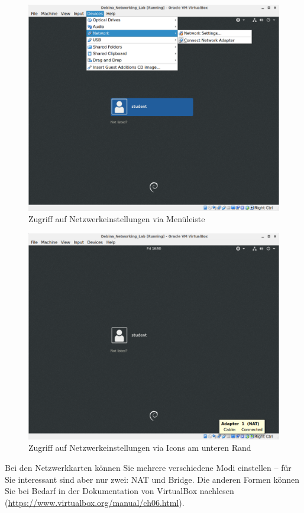 \documentclass[paper=a4,fontsize=11pt]{scrartcl}%
\numberwithin{equation}{section}
\begin{document}
\begin{figure}[H]
\centering
\includegraphics[scale=0.4]{vbox3}
\caption{Zugriff auf Netzwerkeinstellungen via Menüleiste}
\label{vbox3}
\end{figure}
\begin{figure}[H]
\centering
\includegraphics[scale=0.4]{vbox4}
\caption{Zugriff auf Netzwerkeinstellungen via Icons am unteren Rand}
\label{vbox4}
\end{figure}
Bei den Netzwerkkarten können Sie mehrere verschiedene Modi einstellen -- für Sie interessant
sind aber nur zwei: NAT und Bridge. Die anderen Formen können Sie bei Bedarf in der Dokumentation von VirtualBox nachlesen (\url{https://www.virtualbox.org/manual/ch06.html}).
\end{document}
